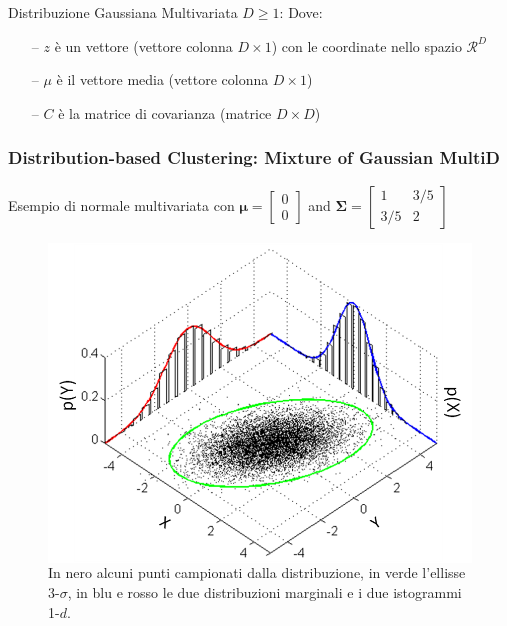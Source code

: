 {\begin{frame}
\begin{scriptsize}
\begin{block}{Distribuzione Gaussiana Multivariata $D \geq 1$:}
			Dove:
			\begin{itemize}
				\item[--] $z$ è un vettore (vettore colonna $D \times 1$) con le coordinate nello spazio $\mathcal{R}^D$
				\item[--] $\mu$ è il vettore media (vettore colonna $D \times 1$)
				\item[--] $C$ è la matrice di covarianza (matrice $D \times D$)
			\end{itemize}
					
	\end{block}
	\end{scriptsize}	

\end{frame}



\begin{frame}

	\frametitle{{\color{GradientDescentDiagramOrange}Distribution-based Clustering}: Mixture of Gaussian MultiD}

	\begin{block}{Esempio di normale multivariata con ${\displaystyle {\boldsymbol {\mu }}=\left[{\begin{smallmatrix}0\\0\end{smallmatrix}}\right]}$ and ${\displaystyle {\boldsymbol {\Sigma }}=\left[{\begin{smallmatrix}1&3/5\\3/5&2\end{smallmatrix}}\right]}$}
		\begin{figure}[!htbp]
			\centering
			
			\begin{columns}

				\includegraphics[width=0.8\linewidth]{images/unsupervised/gaussian_mixture/multivariate_normal_1.png}
				\caption{In nero alcuni punti campionati dalla distribuzione, in verde l'ellisse 3-$\sigma$, in blu e rosso le due distribuzioni marginali e i due istogrammi 1-$d$.}
					

\end{columns}
\end{figure}
\end{block}
\end{frame}}
